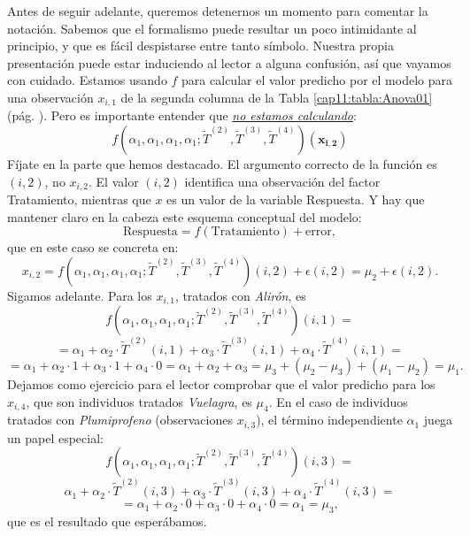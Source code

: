 \begin{ejemplo}
Antes de seguir adelante, queremos detenernos un momento para comentar la notación. Sabemos que el formalismo puede resultar un poco intimidante al principio, y que es fácil despistarse entre tanto símbolo. Nuestra propia presentación puede estar induciendo al lector a alguna confusión, así que vayamos con cuidado. Estamos usando $f$ para calcular el valor predicho por el modelo para una observación $x_{i,1}$ de la segunda columna de la Tabla \ref{cap11:tabla:Anova01} (pág. \pageref{cap11:tabla:Anova01}). Pero es importante entender que {\em \underline{no estamos calculando}}:
\[f(\alpha_1,\alpha_1,\alpha_1,\alpha_1;\tilde{T}^{(2)},\tilde{T}^{(3)},\tilde{T}^{(4)})(\mathbf{x_{i,2}})\]
Fíjate en la parte que hemos destacado. El argumento correcto de la función es $(i,2)$, no $x_{i,2}$. El valor $(i,2)$ identifica una observación del factor Tratamiento, mientras que $x$ es un valor de la variable Respuesta. Y hay que mantener claro en la cabeza este esquema conceptual del modelo:
\[\mbox{Respuesta} = f(\mbox{Tratamiento}) + \mbox{error},\]
que en este caso se concreta en:
\[x_{i,2}=
f(\alpha_1,\alpha_1,\alpha_1,\alpha_1;\tilde{T}^{(2)},\tilde{T}^{(3)},\tilde{T}^{(4)})(i,2)
+\epsilon(i,2)=\mu_2+\epsilon(i,2).
\]
Sigamos adelante. Para los $x_{i,1}$, tratados con {\em Alirón}, es
\[f(\alpha_1,\alpha_1,\alpha_1,\alpha_1;\tilde{T}^{(2)},\tilde{T}^{(3)},\tilde{T}^{(4)})(i,1)=\]
\[=\alpha_1 + \alpha_2\cdot \tilde{T}^{(2)}(i,1)+\alpha_3\cdot \tilde{T}^{(3)}(i,1)+\alpha_4\cdot \tilde{T}^{(4)}(i,1)=\]
\[
=\alpha_1+\alpha_2\cdot 1+\alpha_3\cdot 1+\alpha_4\cdot 0=\alpha_1+\alpha_2+\alpha_3=\mu_3+(\mu_2-\mu_3)+(\mu_1-\mu_2)=\mu_1.
\]
Dejamos como ejercicio para el lector comprobar que el valor predicho para los $x_{i,4}$, que son individuos tratados {\em Vuelagra}, es $\mu_4$. En el caso de individuos tratados con {\em Plumiprofeno} (observaciones $x_{i,3}$), el término independiente $\alpha_1$ juega un papel especial:
\[f(\alpha_1,\alpha_1,\alpha_1,\alpha_1;\tilde{T}^{(2)},\tilde{T}^{(3)},\tilde{T}^{(4)})(i,3)=\]
\[\alpha_1 + \alpha_2\cdot \tilde{T}^{(2)}(i,3)+\alpha_3\cdot \tilde{T}^{(3)}(i,3)+\alpha_4\cdot \tilde{T}^{(4)}(i,3)=\]
\[
=\alpha_1+\alpha_2\cdot 0+\alpha_3\cdot 0+\alpha_4\cdot 0=\alpha_1=\mu_3,
\]
que es el resultado que esperábamos.


\end{ejemplo}
